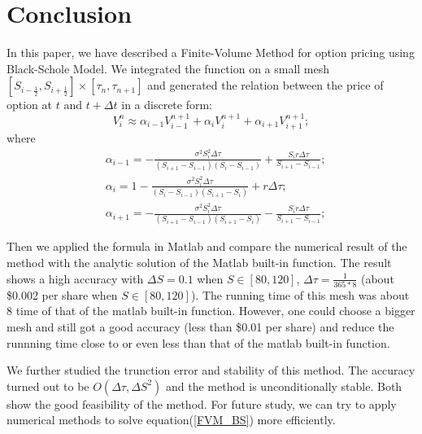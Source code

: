 \documentclass[final]{siamltex}
\begin{document}
\section{Conclusion}
In this paper, we have described a Finite-Volume Method for option pricing using Black-Schole Model. We integrated the function on a small mesh $[S_{i-\frac{1}{2}},S_{i+\frac{1}{2}}]\times[\tau_{n},\tau_{n+1}]$ and generated the relation between the price of option at $t$ and $t+\Delta t$ in a discrete form:
\begin{equation*}
V_i^n \approx \alpha _{i-1} V_{i-1}^{n+1} + \alpha _{i} V_{i}^{n+1} + \alpha _{i+1} V_{i+1}^{n+1};
\end{equation*}
where 
\begin{equation*}
\begin{split}
& \alpha_{i-1}  =  -\frac {\sigma^2 S_i^2 \Delta \tau}{(S_{i+1} -S_{i-1}) (S_{i}-S_{i-1})} + \frac{S_i r \Delta \tau} {S_{i+1}-S_{i-1}};\\
& \alpha_{i}  = 1 - \frac {\sigma^2 S_i^2 \Delta \tau}{(S_{i}-S_{i-1}) (S_{i+1}-S_i)} + r \Delta \tau;\\
& \alpha_{i+1}  = -\frac {\sigma^2 S_i^2 \Delta \tau}{(S_{i+1} -S_{i-1}) (S_{i+1}-S_i)} - \frac{S_i r \Delta \tau} {S_{i+1}-S_{i-1}};
\end{split}
\end{equation*}

Then we applied the formula in Matlab and compare the numerical result of the method with the analytic solution of the Matlab built-in function. The result shows a high accuracy with $\Delta S = 0.1$ when $S\in [80,120]$, $\Delta \tau = \frac{1}{365*8}$ (about \$0.002 per share when $S \in [80,120]$). The running time of this mesh was about 8 time of that of the matlab built-in function. However, one could choose a bigger mesh and still got a good accuracy (less than \$0.01 per share) and reduce the runnning time close to or even less than that of the matlab built-in function.

We further studied the trunction error and stability of this method. The accuracy turned out to be $O(\Delta \tau, \Delta S^2)$ and the method is unconditionally stable. Both show the good feasibility of the method. For future study, we can try to apply numerical methods to solve equation(\ref{FVM_BS}) more efficiently.

\nocite{*}		%
\end{document}
